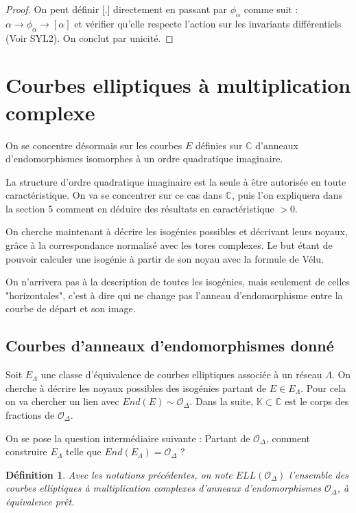 \documentclass{article}
\newcommand{\C}[0]{\mathbb{C}}
\newcommand{\K}[0]{\mathbb{K}}
\newcommand{\OR}[0]{\mathcal{O}}
\newtheorem{Def}[The]{Définition}
\begin{document}
\begin{proof}
	On peut définir [.] directement en passant par $\phi_{\alpha}$ comme suit : $\alpha\rightarrow\phi_{\alpha}\rightarrow [\alpha]$ et vérifier qu'elle respecte l'action sur les invariants différentiels (Voir SYL2). On conclut par unicité. 
\end{proof}




\section{Courbes elliptiques à multiplication complexe}

On se concentre désormais sur les courbes $E$ définies sur $\C$ d'anneaux d'endomorphismes isomorphes à un ordre quadratique imaginaire. 

La structure d'ordre quadratique imaginaire est la seule à être autorisée en toute caractéristique. On va se concentrer sur ce cas dans $\C$, puis l'on expliquera dans la section 5 comment en déduire des résultats en caractéristique $>0$.

On cherche maintenant à décrire les isogénies possibles et décrivant leurs noyaux, grâce à la correspondance normalisé avec les tores complexes. Le but étant de pouvoir calculer une isogénie à partir de son noyau avec la formule de Vélu. 

On n'arrivera pas à la description de toutes les isogénies, mais seulement de celles "horizontales", c'est à dire qui ne change pas l’anneau d'endomorphisme entre la courbe de départ et son image. 

\subsection{Courbes d'anneaux d'endomorphismes donné}

Soit $E_{\Lambda}$ une classe d'équivalence de courbes elliptiques associée à un réseau $\Lambda$. On cherche à décrire les noyaux possibles des isogénies partant de $E\in E_{\Lambda}$. Pour cela on va chercher un lien avec $End(E)\sim\OR_{\Delta}$. Dans la suite, $\K\subset\C$ est le corps des fractions de $\OR_{\Delta}$. 

On se pose la question intermédiaire suivante : Partant de $\OR_{\Delta}$, comment construire $E_{\Lambda}$ telle que $End(E_{\Lambda}) = \OR_{\Delta}$ ? 

\begin{Def}
	Avec les notations précédentes, on note $ELL(\OR_{\Delta})$ l'ensemble des courbes elliptiques à multiplication complexes d'anneaux d'endomorphismes $\OR_{\Delta}$, à équivalence prêt. 
\end{Def}
\end{document}
